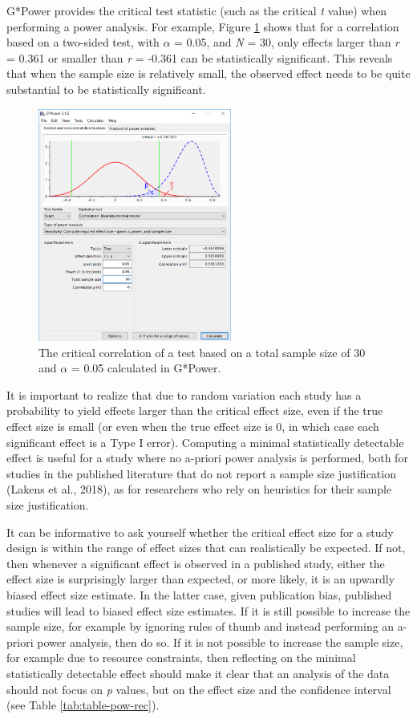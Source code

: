 \documentclass[
  english,
  ,jou, a4paper,floatsintext]{apa6}
\begin{document}
G*Power provides the critical test statistic (such as the critical \emph{t} value) when performing a power analysis. For example, Figure \ref{fig:gcrit2} shows that for a correlation based on a two-sided test, with \(\alpha\) = 0.05, and \emph{N} = 30, only effects larger than \emph{r} = 0.361 or smaller than \emph{r} = -0.361 can be statistically significant. This reveals that when the sample size is relatively small, the observed effect needs to be quite substantial to be statistically significant.

\begin{figure}
\includegraphics[width=240px]{images/gpowcrit2} \caption{The critical correlation of a test based on a total sample size of 30 and $\alpha$ = 0.05 calculated in G*Power.}\label{fig:gcrit2}
\end{figure}

It is important to realize that due to random variation each study has a probability to yield effects larger than the critical effect size, even if the true effect size is small (or even when the true effect size is 0, in which case each significant effect is a Type I error). Computing a minimal statistically detectable effect is useful for a study where no a-priori power analysis is performed, both for studies in the published literature that do not report a sample size justification (Lakens et al., 2018), as for researchers who rely on heuristics for their sample size justification.

It can be informative to ask yourself whether the critical effect size for a study design is within the range of effect sizes that can realistically be expected. If not, then whenever a significant effect is observed in a published study, either the effect size is surprisingly larger than expected, or more likely, it is an upwardly biased effect size estimate. In the latter case, given publication bias, published studies will lead to biased effect size estimates. If it is still possible to increase the sample size, for example by ignoring rules of thumb and instead performing an a-priori power analysis, then do so. If it is not possible to increase the sample size, for example due to resource constraints, then reflecting on the minimal statistically detectable effect should make it clear that an analysis of the data should not focus on \emph{p} values, but on the effect size and the confidence interval (see Table \ref{tab:table-pow-rec}).
\end{document}
